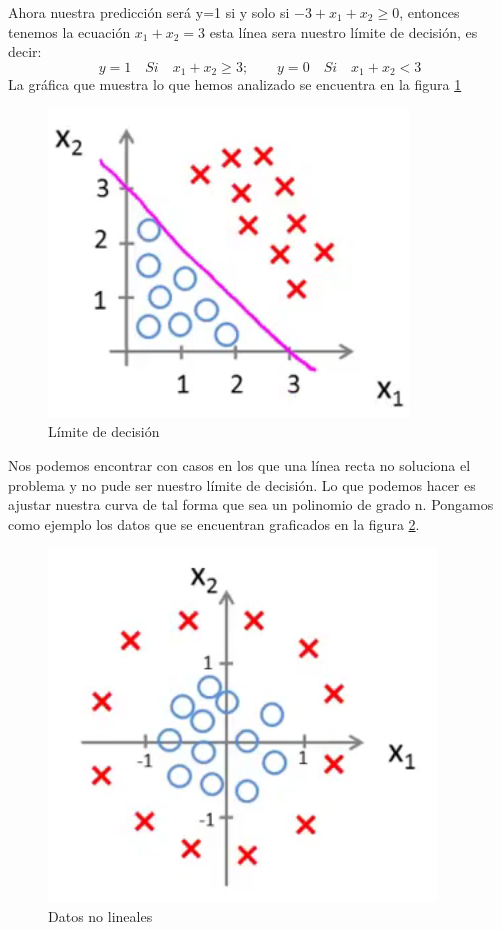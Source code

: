 \documentclass{report}
\begin{document}
Ahora nuestra predicción será y=1 si y solo si $ -3+x_1+x_2\geq0 $, entonces tenemos la ecuación $ x_1+x_2=3 $ esta línea sera nuestro límite de decisión, es decir:\[
y=1\quad Si\quad x_1+x_2\geq3; \qquad  y=0\quad Si\quad x_1+x_2<3
\]
La gráfica que muestra lo que hemos analizado se encuentra en la figura \ref{Fig:DB1}
\begin{figure}[h]
	\centering
	\includegraphics[scale=0.5]{img/DB1}
	\caption{Límite de decisión}
	\label{Fig:DB1}
\end{figure}
Nos podemos encontrar con casos en los que una línea recta no soluciona el problema y no pude ser nuestro límite de decisión. Lo que podemos hacer es ajustar nuestra curva de tal forma que sea un polinomio de grado n. Pongamos como ejemplo los datos que se encuentran graficados en la figura \ref{Fig:DB2}.
\begin{figure}[h]
	\centering
	\includegraphics[scale=0.5]{img/DB2}
	\caption{Datos no lineales}
	\label{Fig:DB2}
\end{figure}
\end{document}
